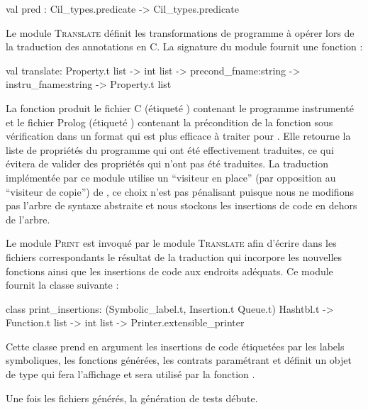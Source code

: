 \begin{ocamlcode}
val pred : Cil_types.predicate -> Cil_types.predicate
\end{ocamlcode}

Le module \textsc{Translate} définit les transformations de programme à opérer
lors de la traduction des annotations \eacsl en C.
La signature du module fournit une fonction  :

\begin{ocamlcode}
val translate:
  Property.t list ->
  int list ->
  precond_fname:string ->
  instru_fname:string ->
  Property.t list
\end{ocamlcode}

La fonction  produit le fichier C (étiqueté
) contenant le programme instrumenté et le fichier
Prolog (étiqueté ) contenant la précondition de la
fonction sous vérification dans un format qui est plus efficace à traiter pour
\pathcrawler.
Elle retourne la liste de propriétés du programme qui ont été effectivement
traduites, ce qui évitera de valider des propriétés qui n'ont pas été traduites.
La traduction implémentée par ce module utilise un ``visiteur en place'' (par
opposition au ``visiteur de copie'') de \framac
\cite[section 4.16]{frama-c-devman}, ce choix n'est pas pénalisant
puisque nous ne modifions pas l'arbre de syntaxe abstraite et nous stockons les
insertions de code en dehors de l'arbre.

Le module \textsc{Print} est invoqué par le module \textsc{Translate} afin
d'écrire dans les fichiers correspondants le résultat de la traduction qui
incorpore les nouvelles fonctions ainsi que les insertions de code aux endroits 
adéquats.
Ce module fournit la classe  suivante :

\begin{ocamlcode}
class print_insertions:
  (Symbolic_label.t, Insertion.t Queue.t) Hashtbl.t ->
  Function.t list ->
  int list ->
  Printer.extensible_printer
\end{ocamlcode}

Cette classe prend en argument les insertions de code étiquetées par les
labels symboliques, les fonctions générées, les contrats paramétrant \SWD et
définit un objet de type  qui fera l'affichage et sera
utilisé par la fonction .

Une fois les fichiers générés, la génération de tests débute.


